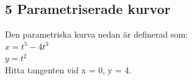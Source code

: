 \documentclass{article}
\begin{document}
\subsection*{5 Parametriserade kurvor}
Den parametriska kurva nedan är definerad som: \\
$x = t^5 - 4t^3$   \\
$y = t^2$ \\
Hitta tangenten vid x = 0, y = 4.
\end{document}
